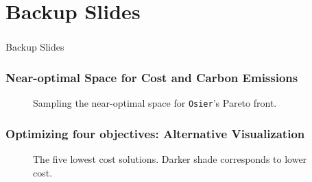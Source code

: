 \section*{Backup Slides}

\begin{frame}
    \frametitle{}

    \begin{center}
        \Huge Backup Slides
    \end{center}
    
\end{frame}

\begin{frame}
    \frametitle{Near-optimal Space for Cost and Carbon Emissions}

    \begin{figure}
        \centering 
        \resizebox{0.75\columnwidth}{!}{}
        \caption{Sampling the near-optimal space for \texttt{Osier}'s Pareto
        front.}
        \label{fig:osier-temoa-benchmark-1}
    \end{figure}

\end{frame}


\begin{frame}
    \frametitle{Optimizing four objectives: Alternative Visualization}

    \begin{figure}
        \centering 
        \resizebox{0.9\columnwidth}{!}{}
        \caption{The five lowest cost solutions. Darker shade corresponds to lower cost.}
        \label{fig:4-obj-design-space-total-cost}
    \end{figure}

\end{frame}





